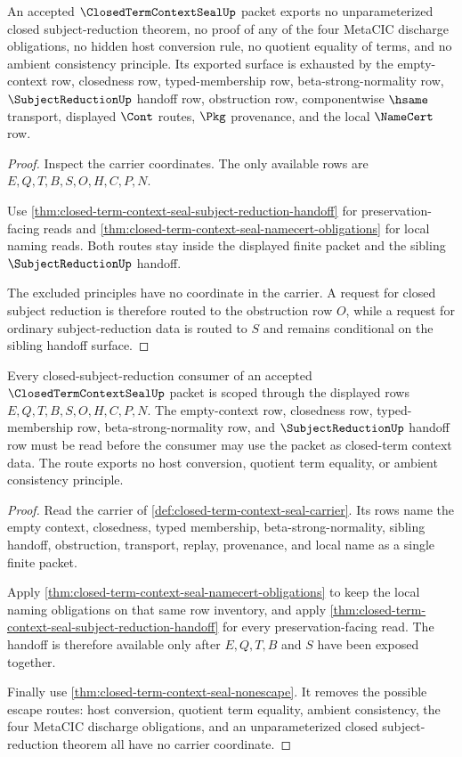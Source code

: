 \begin{theorem}
\label{thm:closed-term-context-seal-nonescape}
An accepted $\ClosedTermContextSealUp$ packet exports no unparameterized closed subject-reduction theorem, no proof of any of the four MetaCIC discharge obligations, no hidden host conversion rule, no quotient equality of terms, and no ambient consistency principle. Its exported surface is exhausted by the empty-context row, closedness row, typed-membership row, beta-strong-normality row, $\SubjectReductionUp$ handoff row, obstruction row, componentwise $\hsame$ transport, displayed $\Cont$ routes, $\Pkg$ provenance, and the local $\NameCert$ row.
\end{theorem}
\begin{proof}
Inspect the carrier coordinates. The only available rows are $E,Q,T,B,S,O,H,C,P,N$.

Use \autoref{thm:closed-term-context-seal-subject-reduction-handoff} for preservation-facing reads and \autoref{thm:closed-term-context-seal-namecert-obligations} for local naming reads. Both routes stay inside the displayed finite packet and the sibling $\SubjectReductionUp$ handoff.

The excluded principles have no coordinate in the carrier. A request for closed subject reduction is therefore routed to the obstruction row $O$, while a request for ordinary subject-reduction data is routed to $S$ and remains conditional on the sibling handoff surface.
\end{proof}

\begin{theorem}
\label{thm:closed-term-context-seal-scoped-kernel-route}
Every closed-subject-reduction consumer of an accepted $\ClosedTermContextSealUp$ packet is scoped through the displayed rows $E,Q,T,B,S,O,H,C,P,N$. The empty-context row, closedness row, typed-membership row, beta-strong-normality row, and $\SubjectReductionUp$ handoff row must be read before the consumer may use the packet as closed-term context data. The route exports no host conversion, quotient term equality, or ambient consistency principle.
\end{theorem}
\begin{proof}
Read the carrier of \autoref{def:closed-term-context-seal-carrier}. Its rows name the empty context, closedness, typed membership, beta-strong-normality, sibling handoff, obstruction, transport, replay, provenance, and local name as a single finite packet.

Apply \autoref{thm:closed-term-context-seal-namecert-obligations} to keep the local naming obligations on that same row inventory, and apply \autoref{thm:closed-term-context-seal-subject-reduction-handoff} for every preservation-facing read. The handoff is therefore available only after $E,Q,T,B$ and $S$ have been exposed together.

Finally use \autoref{thm:closed-term-context-seal-nonescape}. It removes the possible escape routes: host conversion, quotient term equality, ambient consistency, the four MetaCIC discharge obligations, and an unparameterized closed subject-reduction theorem all have no carrier coordinate.
\end{proof}

